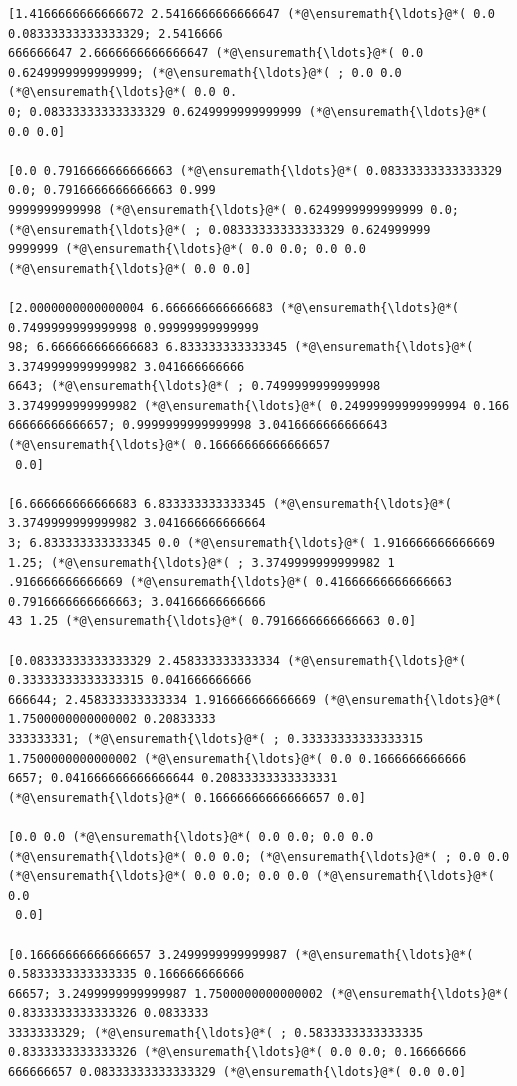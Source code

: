 \documentclass[12pt,a4paper]{article}
\begin{document}
\begin{lstlisting}
[1.4166666666666672 2.5416666666666647 (*@\ensuremath{\ldots}@*( 0.0 0.08333333333333329; 2.5416666
666666647 2.6666666666666647 (*@\ensuremath{\ldots}@*( 0.0 0.6249999999999999; (*@\ensuremath{\ldots}@*( ; 0.0 0.0 (*@\ensuremath{\ldots}@*( 0.0 0.
0; 0.08333333333333329 0.6249999999999999 (*@\ensuremath{\ldots}@*( 0.0 0.0]

[0.0 0.7916666666666663 (*@\ensuremath{\ldots}@*( 0.08333333333333329 0.0; 0.7916666666666663 0.999
9999999999998 (*@\ensuremath{\ldots}@*( 0.6249999999999999 0.0; (*@\ensuremath{\ldots}@*( ; 0.08333333333333329 0.624999999
9999999 (*@\ensuremath{\ldots}@*( 0.0 0.0; 0.0 0.0 (*@\ensuremath{\ldots}@*( 0.0 0.0]

[2.0000000000000004 6.666666666666683 (*@\ensuremath{\ldots}@*( 0.7499999999999998 0.99999999999999
98; 6.666666666666683 6.833333333333345 (*@\ensuremath{\ldots}@*( 3.3749999999999982 3.041666666666
6643; (*@\ensuremath{\ldots}@*( ; 0.7499999999999998 3.3749999999999982 (*@\ensuremath{\ldots}@*( 0.24999999999999994 0.166
66666666666657; 0.9999999999999998 3.0416666666666643 (*@\ensuremath{\ldots}@*( 0.16666666666666657
 0.0]

[6.666666666666683 6.833333333333345 (*@\ensuremath{\ldots}@*( 3.3749999999999982 3.041666666666664
3; 6.833333333333345 0.0 (*@\ensuremath{\ldots}@*( 1.916666666666669 1.25; (*@\ensuremath{\ldots}@*( ; 3.3749999999999982 1
.916666666666669 (*@\ensuremath{\ldots}@*( 0.41666666666666663 0.7916666666666663; 3.04166666666666
43 1.25 (*@\ensuremath{\ldots}@*( 0.7916666666666663 0.0]

[0.08333333333333329 2.458333333333334 (*@\ensuremath{\ldots}@*( 0.33333333333333315 0.041666666666
666644; 2.458333333333334 1.916666666666669 (*@\ensuremath{\ldots}@*( 1.7500000000000002 0.20833333
333333331; (*@\ensuremath{\ldots}@*( ; 0.33333333333333315 1.7500000000000002 (*@\ensuremath{\ldots}@*( 0.0 0.1666666666666
6657; 0.041666666666666644 0.20833333333333331 (*@\ensuremath{\ldots}@*( 0.16666666666666657 0.0]

[0.0 0.0 (*@\ensuremath{\ldots}@*( 0.0 0.0; 0.0 0.0 (*@\ensuremath{\ldots}@*( 0.0 0.0; (*@\ensuremath{\ldots}@*( ; 0.0 0.0 (*@\ensuremath{\ldots}@*( 0.0 0.0; 0.0 0.0 (*@\ensuremath{\ldots}@*( 0.0
 0.0]

[0.16666666666666657 3.2499999999999987 (*@\ensuremath{\ldots}@*( 0.5833333333333335 0.166666666666
66657; 3.2499999999999987 1.7500000000000002 (*@\ensuremath{\ldots}@*( 0.8333333333333326 0.0833333
3333333329; (*@\ensuremath{\ldots}@*( ; 0.5833333333333335 0.8333333333333326 (*@\ensuremath{\ldots}@*( 0.0 0.0; 0.16666666
666666657 0.08333333333333329 (*@\ensuremath{\ldots}@*( 0.0 0.0]


\end{lstlisting}
\end{document}
